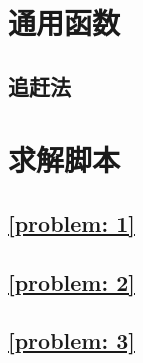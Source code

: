 \documentclass[a4paper, 12pt]{ctexart}
\let\oldlstinputlisting
\renewcommand{}[2][\empty]{
    \par\nolinenumbers\oldlstinputlisting[#1]{#2}\linenumbers\par
}
\theoremstyle{plain}
\theoremstyle{plain}
\theoremstyle{plain}
\theoremstyle{nonumberplain}
\begin{document}



    \newpage
    \appendix

    \section{通用函数}

    \subsection{追赶法}

    

    \section{求解脚本}

    \subsection{\ref{problem: 1}}

    

    \subsection{\ref{problem: 2}}

    

    \subsection{\ref{problem: 3}}

    
\end{document}
